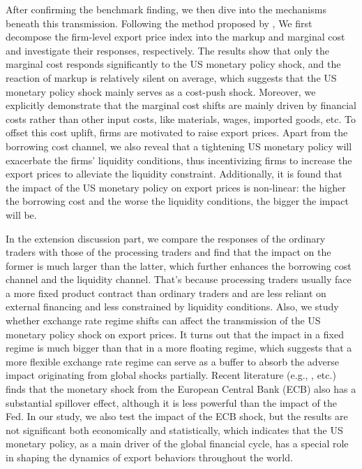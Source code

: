 After confirming the benchmark finding, we then dive into the mechanisms beneath this transmission. Following the method proposed by \cite{deloecker2012markups}, We first decompose the firm-level export price index into the markup and marginal cost and investigate their responses, respectively. The results show that only the marginal cost responds significantly to the US monetary policy shock, and the reaction of markup is relatively silent on average, which suggests that the US monetary policy shock mainly serves as a cost-push shock. Moreover, we explicitly demonstrate that the marginal cost shifts are mainly driven by financial costs rather than other input costs, like materials, wages, imported goods, etc. To offset this cost uplift, firms are motivated to raise export prices. Apart from the borrowing cost channel, we also reveal that a tightening US monetary policy will exacerbate the firms' liquidity conditions, thus incentivizing firms to increase the export prices to alleviate the liquidity constraint. Additionally, it is found that the impact of the US monetary policy on export prices is non-linear: the higher the borrowing cost and the worse the liquidity conditions, the bigger the impact will be. 

In the extension discussion part, we compare the responses of the ordinary traders with those of the processing traders and find that the impact on the former is much larger than the latter, which further enhances the borrowing cost channel and the liquidity channel. That's because processing traders usually face a more fixed product contract than ordinary traders and are less reliant on external financing and less constrained by liquidity conditions. Also, we study whether exchange rate regime shifts can affect the transmission of the US monetary policy shock on export prices. It turns out that the impact in a fixed regime is much bigger than that in a more floating regime, which suggests that a more flexible exchange rate regime can serve as a buffer to absorb the adverse impact originating from global shocks partially. Recent literature (e.g., \cite{miranda2022tale}, etc.) finds that the monetary shock from the European Central Bank (ECB) also has a substantial spillover effect, although it is less powerful than the impact of the Fed. In our study, we also test the impact of the ECB shock, but the results are not significant both economically and statistically, which indicates that the US monetary policy, as a main driver of the global financial cycle, has a special role in shaping the dynamics of export behaviors throughout the world.


